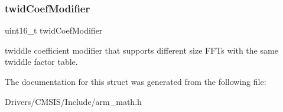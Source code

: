 \subsubsection{\texorpdfstring{twid\+Coef\+Modifier}{twidCoefModifier}}
{\footnotesize\ttfamily uint16\+\_\+t twid\+Coef\+Modifier}

twiddle coefficient modifier that supports different size F\+F\+Ts with the same twiddle factor table. 

The documentation for this struct was generated from the following file\+:\begin{DoxyCompactItemize}
\item 
Drivers/\+C\+M\+S\+I\+S/\+Include/arm\+\_\+math.\+h\end{DoxyCompactItemize}
